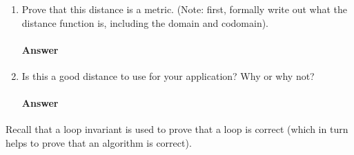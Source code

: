 \documentclass{article}
\begin{document}
\begin{enumerate}

    \item Prove that this distance is a metric. (Note: first, formally write out
        what the distance function is, including the domain and codomain).

        \paragraph{Answer}


    \item Is this a good distance to use for your application?  Why or why not?

        \paragraph{Answer}


\end{enumerate}


 

Recall that a loop invariant is used to prove that a loop is correct (which in
turn helps to prove that an algorithm is correct).
\end{document}
